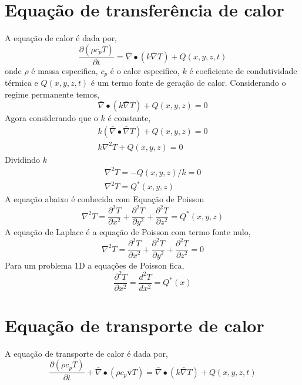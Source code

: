 %
\section{Equação de transferência de calor }
%
A equação de calor é dada por,
%
\begin{equation}
	\frac{\partial( \rho c_p T )}{\partial t} = \bar \nabla \bullet ( k \bar \nabla T ) + Q(x, y, z, t)
\end{equation}
%
onde $\rho$ é massa especifica, $c_p$ é o calor especifico, $k$ é coeficiente de condutividade térmica e $Q(x, y, z, t)$ é um termo fonte de geração de calor.  
%
Considerando o regime permanente temos,
%
\begin{equation}
	\bar \nabla \bullet ( k \bar \nabla T ) + Q(x, y, z) = 0
\end{equation}
%
Agora considerando que o $k$ é constante,
%
\begin{equation}
	\begin{split}
		k\left(\bar \nabla \bullet \bar \nabla T\right) + Q(x, y, z) = 0\\	 
		k \nabla^2 T + Q(x, y, z) = 0
	\end{split}
\end{equation}
%
Dividindo $k$
%
\begin{equation}
	\begin{split}
		\nabla^2 T = -Q(x, y, z)/ k = 0\\	 
		\nabla^2 T = Q^*(x, y, z)
	\end{split}
\end{equation}
%
A equação abaixo é conhecida com Equação de Poisson
%
\begin{equation}
	\nabla^2 T = \frac{\partial^2 T}{\partial x^2} + \frac{\partial^2 T}{\partial y^2} + \frac{\partial^2 T}{\partial z^2} = Q^*(x, y, z)	
\end{equation}
%
A equação de Laplace é a equação de Poisson com termo fonte nulo,
%
\begin{equation}
	\nabla^2 T = \frac{\partial^2 T}{\partial x^2} + \frac{\partial^2 T}{\partial y^2} + \frac{\partial^2 T}{\partial z^2} = 0
\end{equation}
%
Para um problema 1D a equações de Poisson fica,
%
\begin{equation}
	\frac{\partial^2 T}{\partial x^2} = \frac{d^2 T}{d x^2} = Q^*(x)	
\end{equation}
%
%
\section{Equação de transporte de calor }
%
A equação de transporte de calor é dada por,
%
\begin{equation}
	\frac{\partial( \rho c_p T )}{\partial t} + \bar \nabla \bullet (\rho c_p \pmb{\bar v} T ) = \bar \nabla \bullet ( k \bar \nabla T ) + Q(x, y, z, t)
\end{equation}